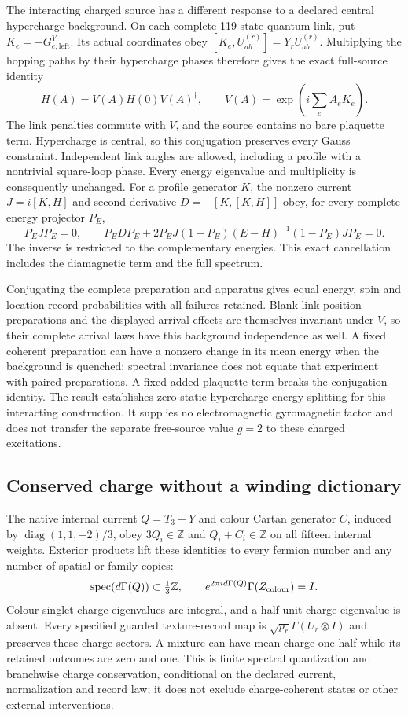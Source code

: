 The interacting charged source has a different response to a declared
central hypercharge background. On each complete 119-state quantum link,
put $K_e=-G^Y_{e,\mathrm{left}}$. Its actual coordinates obey
$[K_e,U^{(r)}_{ab}]=Y_rU^{(r)}_{ab}$. Multiplying the hopping paths by
their hypercharge phases therefore gives the exact full-source identity
\[
 H(A)=V(A)H(0)V(A)^\dagger,\qquad
 V(A)=\exp\!\left(i\sum_e A_eK_e\right).
\]
The link penalties commute with $V$, and the source contains no bare
plaquette term. Hypercharge is central, so this conjugation preserves
every Gauss constraint. Independent link angles are allowed, including a
profile with a nontrivial square-loop phase. Every energy eigenvalue and
multiplicity is consequently unchanged. For a profile generator $K$,
the nonzero current $J=i[K,H]$ and second derivative
$D=-[K,[K,H]]$ obey, for every complete energy projector $P_E$,
\[
 P_EJP_E=0,\qquad
 P_EDP_E+2P_EJ(1-P_E)(E-H)^{-1}(1-P_E)JP_E=0.
\]
The inverse is restricted to the complementary energies. This exact
cancellation includes the diamagnetic term and the full spectrum.

Conjugating the complete preparation and apparatus gives equal energy,
spin and location record probabilities with all failures retained.
Blank-link position preparations and the displayed arrival effects are
themselves invariant under $V$, so their complete arrival laws have this
background independence as well. A fixed coherent preparation can have
a nonzero change in its mean energy when the background is quenched;
spectral invariance does not equate that experiment with paired
preparations. A fixed added plaquette term breaks the conjugation identity.
The result establishes zero static hypercharge energy splitting for this
interacting construction. It supplies no electromagnetic gyromagnetic
factor and does not transfer the separate free-source value $g=2$ to
these charged excitations.

\subsection{Conserved charge without a winding dictionary}

The native internal current $Q=T_3+Y$ and colour Cartan generator $C$, induced by $\operatorname{diag}(1,1,-2)/3$, obey $3Q_i\in\mathbb Z$ and $Q_i+C_i\in\mathbb Z$ on all fifteen internal weights. Exterior products lift these identities to every fermion number and any number of spatial or family copies:
\[
 \operatorname{spec}(d\Gamma(Q))\subset\tfrac13\mathbb Z,
 \qquad e^{2\pi i d\Gamma(Q)}\Gamma(Z_{\rm colour})=I.
\]
Colour-singlet charge eigenvalues are integral, and a half-unit charge eigenvalue is absent. Every specified guarded texture-record map is $\sqrt{p_r}\Gamma(U_r\otimes I)$ and preserves these charge sectors. A mixture can have mean charge one-half while its retained outcomes are zero and one. This is finite spectral quantization and branchwise charge conservation, conditional on the declared current, normalization and record law; it does not exclude charge-coherent states or other external interventions.

